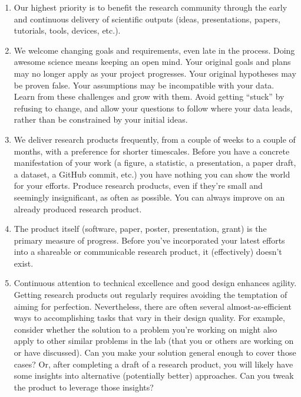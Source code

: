 \documentclass{tufte-book} %
\begin{document}
\begin{enumerate}
\item Our highest priority is to benefit the research community
  through the early and continuous delivery of scientific outputs
  (ideas, presentations, papers, tutorials, tools, devices, etc.).

\item We welcome changing goals and requirements, even late in the process.  Doing
  awesome science means keeping an open mind.  Your original goals and
  plans may no longer apply as your project progresses.  Your original
  hypotheses may be proven false.  Your assumptions may be
  incompatible with your data.  Learn from these challenges and grow
  with them.  Avoid getting ``stuck'' by refusing to change, and allow your questions to follow where your data leads, rather than be constrained by your initial ideas.

\item We deliver research products frequently, from a couple of weeks to
  a couple of months, with a preference for shorter timescales.
  Before you have a concrete manifestation of your work (a figure, a
  statistic, a presentation, a paper draft, a dataset, a GitHub
  commit, etc.) you have nothing you can show the world for your
  efforts.  Produce research products, even if they're small and
  seemingly insignificant, as often as possible.  You can always
  improve on an already produced research product.

  \item The product itself (software, paper, poster,
  presentation, grant) is the primary measure of progress.  Before you've
  incorporated your latest efforts into a shareable or communicable
  research product, it (effectively) doesn't exist.

  \item Continuous attention to technical excellence and good design
  enhances agility.  Getting research products out regularly requires
  avoiding the temptation of aiming for perfection.  Nevertheless,
  there are often several almost-as-efficient ways to accomplishing
  tasks that vary in their design quality.  For example, consider
  whether the solution to a problem you're working on might also apply
  to other similar problems in the lab (that you or others are working
  on or have discussed).  Can you make your solution general enough to
  cover those cases?  Or, after completing a draft of a research
  product, you will likely have some insights into alternative
  (potentially better) approaches.  Can you tweak the product to
  leverage those insights?


\end{enumerate}
\end{document}
